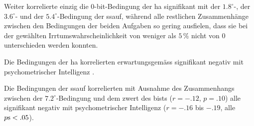 \documentclass[11pt, twoside, a4paper]{book}		%
\begin{document}
Weiter korrelierte einzig die 0-bit-Bedingung der \gls{ha} signifikant mit der $1.8^{\circ}$-, der $3.6^{\circ}$- und der $5.4^{\circ}$-Bedingung der \gls{ssauf}, während alle restlichen Zusammenhänge zwischen den Bedingungen der beiden Aufgaben so gering ausfielen, dass sie bei der gewählten Irrtumswahrscheinlichkeit von weniger als $5\,\%$ nicht von 0 unterschieden werden konnten.

Die Bedingungen der \gls{ha} korrelierten erwartungsgemäss signifikant negativ mit psychometrischer Intelligenz \citep[$r=-.19$ bis $-.28$, alle $p\textnormal{s}<.05$; vgl. ][]{Sheppard2008}.

Die Bedingungen der \gls{ssauf} korrelierten mit Ausnahme des Zusammenhangs zwischen der $7.2^{\circ}$-Bedingung und dem \gls{zwert} des \gls{bist}s ($r=-.12$, $p=.10$) alle signifikant negativ mit psychometrischer Intelligenz ($r=-.16$ bis $-.19$, alle $p\textnormal{s}<.05$).
\end{document}
